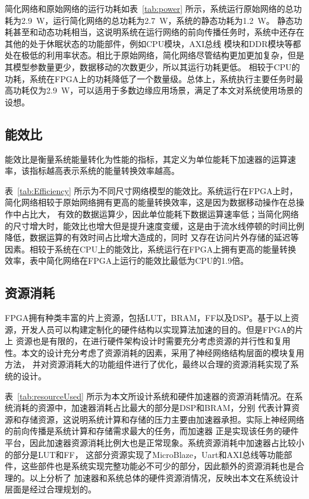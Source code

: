 简化网络和原始网络的运行功耗如表~\ref{tab:power} 所示，系统运行原始网络的总功耗为2.9~W，运行简化网络的总功耗为2.7~W，系统的静态功耗为1.2~W。
静态功耗甚至和动态功耗相当，这说明系统在运行网络的前向传播任务时，系统中还存在其他的处于休眠状态的功能部件，例如CPU模块，AXI总线
模块和DDR模块等都处在极低的利用率状态。相比于原始网络，简化网络尽管结构更加更加复杂，但是其模型参数量更少，数据移动的次数更少，所以其运行功耗更低。
相较于CPU的功耗，系统在FPGA上的功耗降低了一个数量级。总体上，系统执行主要任务时最高功耗仅为2.9~W，可以适用于多数边缘应用场景，满足了本文对系统使用场景的设想。

\subsection{能效比}
能效比是衡量系统能量转化为性能的指标，其定义为单位能耗下加速器的运算速率，该指标越高表示系统的能量转换效率越高。

表~\ref{tab:Efficiency} 所示为不同尺寸网络模型的能效比。系统运行在FPGA上时，简化网络相较于原始网络拥有更高的能量转换效率，这是因为数据移动操作在总操作中占比大，
有效的数据运算少，因此单位能耗下数据运算速率低；当简化网络的尺寸增大时，能效比也增大但是提升速度变缓，这是由于流水线停顿的时间比例降低，数据运算的有效时间占比增大造成的，同时
又存在访问片外存储的延迟等因素。相较于系统在CPU上的能效比，系统运行在FPGA上拥有更高的能量转换效率，表中简化网络在FPGA上运行的能效比最低为CPU的1.9倍。


\subsection{资源消耗}
FPGA拥有种类丰富的片上资源，包括LUT，BRAM，FF以及DSP。基于以上资源，开发人员可以构建定制化的硬件结构以实现算法加速的目的。但是FPGA的片上
资源也是有限的，在进行硬件架构设计时需要充分考虑资源的并行性和复用性。本文的设计充分考虑了资源消耗的因素，采用了神经网络结构层面的模块复用方法，
并对资源消耗大的功能组件进行了优化，最终以合理的资源消耗实现了系统的设计。



表~\ref{tab:resourceUsed} 所示为本文所设计系统和硬件加速器的资源消耗情况。在系统消耗的资源中，加速器消耗占比最大的部分是DSP和BRAM，分别
代表计算资源和存储资源，这说明系统计算和存储的压力主要由加速器承担。实际上神经网络的前向传播是系统计算和存储需求最大的任务，而加速器
正是实现该任务的硬件平台，因此加速器资源消耗比例大也是正常现象。系统资源消耗中加速器占比较小的部分是LUT和FF，
这部分资源实现了MicroBlaze，Uart和AXI总线等功能部件，这些部件也是系统实现完整功能必不可少的部分，因此额外的资源消耗也是合理的。以上分析了
加速器和系统总体的硬件资源消情况，反映出本文在系统设计层面是经过合理规划的。

